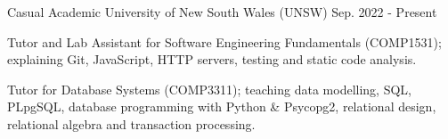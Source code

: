 

\begin{cventries}

  \cventry
    {Casual Academic} %
    {University of New South Wales (UNSW)} %
    {Sep. 2022 - Present} %
    {} %
    {
      \begin{cvitems} %
        \item {Tutor and Lab Assistant for Software Engineering Fundamentals (COMP1531); explaining Git, JavaScript, HTTP servers, testing and static code analysis.}
        \item {Tutor for Database Systems (COMP3311); teaching data modelling, SQL, PLpgSQL, database programming with Python \& Psycopg2, relational design, relational algebra and transaction processing.} 
      \end{cvitems}
    }

\end{cventries}
